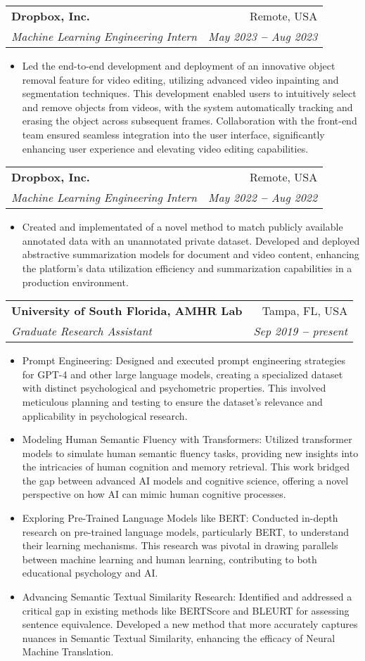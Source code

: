 \documentclass[letterpaper,11pt]{article}
\makeatletter
\newcommand{\resumeItem}[1]{
  \item\small{
    {#1 \vspace{-2pt}}
  }
}
\newcommand{\resumeSubheading}[4]{
  \vspace{-2pt}\item
    \begin{tabular*}{0.97\textwidth}[t]{l@{\extracolsep{\fill}}r}
      \textbf{#1} & #2 \\
      \textit{\small#3} & \textit{\small #4} \\
    \end{tabular*}\vspace{-7pt}
}
\newcommand{\resumeItemListStart}{\begin{itemize}}
\newcommand{\resumeItemListEnd}{\end{itemize}\vspace{-5pt}}
\makeatother
\begin{document}
\resumeSubheading
{Dropbox, Inc.}{Remote, USA}
{Machine Learning Engineering Intern}{May 2023 \textbf{--} Aug 2023}
\resumeItemListStart
\resumeItem{Led the end-to-end development and deployment of an innovative object removal feature for video editing, utilizing advanced video inpainting and segmentation techniques. This development enabled users to intuitively select and remove objects from videos, with the system automatically tracking and erasing the object across subsequent frames. Collaboration with the front-end team ensured seamless integration into the user interface, significantly enhancing user experience and elevating video editing capabilities.}
\resumeItemListEnd

\resumeSubheading
{Dropbox, Inc.}{Remote, USA}
{Machine Learning Engineering Intern}{May 2022 \textbf{--} Aug 2022}
\resumeItemListStart
\resumeItem{Created and implementated of a novel method to match publicly available annotated data with an unannotated private dataset. Developed and deployed abstractive summarization models for document and video content, enhancing the platform's data utilization efficiency and summarization capabilities in a production environment.}
\resumeItemListEnd

\resumeSubheading
{University of South Florida, AMHR Lab}{Tampa, FL, USA}
{Graduate Research Assistant}{Sep 2019 \textbf{--} present}
\resumeItemListStart
\resumeItem{Prompt Engineering: Designed and executed prompt engineering strategies for GPT-4 and other large language models, creating a specialized dataset with distinct psychological and psychometric properties. This involved meticulous planning and testing to ensure the dataset's relevance and applicability in psychological research.}
\resumeItem{Modeling Human Semantic Fluency with Transformers: Utilized transformer models to simulate human semantic fluency tasks, providing new insights into the intricacies of human cognition and memory retrieval. This work bridged the gap between advanced AI models and cognitive science, offering a novel perspective on how AI can mimic human cognitive processes.}
\resumeItem{Exploring Pre-Trained Language Models like BERT: Conducted in-depth research on pre-trained language models, particularly BERT, to understand their learning mechanisms. This research was pivotal in drawing parallels between machine learning and human learning, contributing to both educational psychology and AI.}
\resumeItem{Advancing Semantic Textual Similarity Research: Identified and addressed a critical gap in existing methods like BERTScore and BLEURT for assessing sentence equivalence. Developed a new method that more accurately captures nuances in Semantic Textual Similarity, enhancing the efficacy of Neural Machine Translation.}
\resumeItemListEnd
\end{document}
